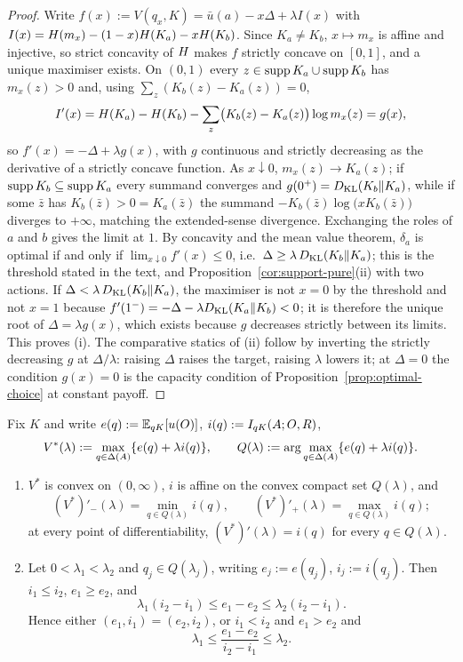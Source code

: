 \begin{proof}
Write $f(x):=V(q_x,K)=\bar u(a)-x\Delta+\lambda I(x)$ with
$I(x)=H(m_x)-(1-x)H(K_a)-xH(K_b)$.  Since $K_a\ne K_b$,
$x\mapsto m_x$ is affine and injective, so strict concavity of $H$ \cite{CoverThomas2006} makes $f$ strictly
concave on $[0,1]$, and a unique maximiser exists.  On $(0,1)$ every $z\in\operatorname{supp} K_a\cup\operatorname{supp} K_b$ has $m_x(z)>0$
and, using $\sum_z(K_b(z)-K_a(z))=0$,
\[
 I'(x)=H(K_a)-H(K_b)-\sum_z\bigl(K_b(z)-K_a(z)\bigr)\log m_x(z)=g(x),
\]
so $f'(x)=-\Delta+\lambda g(x)$, with $g$ continuous and strictly decreasing as the derivative of a strictly
concave function.  As $x\downarrow0$, $m_x(z)\to K_a(z)$; if $\operatorname{supp} K_b\subseteq\operatorname{supp} K_a$ every summand converges
and $g(0^+)=D_{\mathrm{KL}}(K_b\|K_a)$, while if some $\bar z$ has $K_b(\bar z)>0=K_a(\bar z)$ the summand
$-K_b(\bar z)\log\bigl(xK_b(\bar z)\bigr)$ diverges to $+\infty$, matching the extended-sense divergence.
Exchanging the roles of $a$ and $b$ gives the limit at $1$.  By concavity and the mean value theorem,
$\delta_a$ is optimal if and only if $\lim_{x\downarrow0}f'(x)\le0$, i.e.\ $\Delta\ge\lambda\,D_{\mathrm{KL}}(K_b\|K_a)$;
this is the threshold stated in the text, and Proposition~\ref{cor:support-pure}\textup{(ii)} with two actions.
If $\Delta<\lambda\,D_{\mathrm{KL}}(K_b\|K_a)$, the maximiser is not $x=0$ by the threshold and not $x=1$
because $f'(1^-)=-\Delta-\lambda D_{\mathrm{KL}}(K_a\|K_b)<0$; it is therefore the unique root of $\Delta=\lambda g(x)$, which
exists because $g$ decreases strictly between its limits.  This proves \textup{(i)}.  The comparative statics of
\textup{(ii)} follow by inverting the
strictly decreasing $g$ at $\Delta/\lambda$: raising $\Delta$ raises the target, raising $\lambda$ lowers it; at
$\Delta=0$ the condition $g(x)=0$ is the capacity condition of Proposition~\ref{prop:optimal-choice} at constant
payoff.
\end{proof}

\begin{proposition}\label{prop:trace-demand}
Fix $K$ and write $e(q):=\mathbb E_{qK}[u(O)]$, $i(q):=I_{qK}(A;O,R)$,
\[
 V^*(\lambda):=\max_{q\in\Delta(A)}\{e(q)+\lambda i(q)\},
 \qquad
 Q(\lambda):=\arg\max_{q\in\Delta(A)}\{e(q)+\lambda i(q)\}.
\]
\begin{enumerate}[label=\textup{(\roman*)},leftmargin=*]
\item $V^*$ is convex on $(0,\infty)$, $i$ is affine on the convex compact set $Q(\lambda)$, and
\[
 (V^*)'_-(\lambda)=\min_{q\in Q(\lambda)}i(q),
 \qquad
 (V^*)'_+(\lambda)=\max_{q\in Q(\lambda)}i(q);
\]
at every point of differentiability, $(V^*)'(\lambda)=i(q)$ for every $q\in Q(\lambda)$.
\item Let $0<\lambda_1<\lambda_2$ and $q_j\in Q(\lambda_j)$, writing $e_j:=e(q_j)$, $i_j:=i(q_j)$.  Then
$i_1\le i_2$, $e_1\ge e_2$, and
\[
 \lambda_1(i_2-i_1)\le e_1-e_2\le\lambda_2(i_2-i_1).
\]
Hence either $(e_1,i_1)=(e_2,i_2)$, or $i_1<i_2$ and $e_1>e_2$ and
\[
 \lambda_1\le\frac{e_1-e_2}{i_2-i_1}\le\lambda_2.
\]
\end{enumerate}
\end{proposition}

